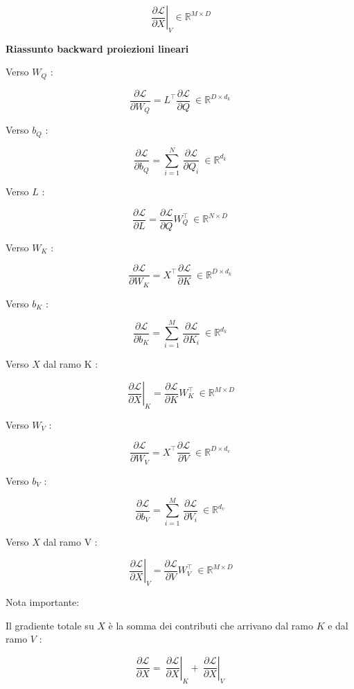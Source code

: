 \documentclass[
  11pt,
]{article}
\begin{document}
\[\left. \ \frac{\partial\mathcal{L}}{\partial X} \right|_{V} \in \mathbb{R}^{M \times D}\]

\textbf{Riassunto backward proiezioni lineari}

Verso \(W_{Q}\) :

\[\frac{\partial\mathcal{L}}{\partial W_{Q}} = L^{\top}\frac{\partial\mathcal{L}}{\partial Q}\  \in \mathbb{R}^{D \times d_{k}}\]

Verso \(b_{Q}\) :

\[\frac{\partial\mathcal{L}}{\partial b_{Q}} = \sum_{i = 1}^{N}\,\frac{\partial\mathcal{L}}{\partial Q_{i}}\  \in \mathbb{R}^{d_{k}}\]

Verso \(L\) :

\[\frac{\partial\mathcal{L}}{\partial L} = \frac{\partial\mathcal{L}}{\partial Q}W_{Q}^{\top}\  \in \mathbb{R}^{N \times D}\]

Verso \(W_{K}\) :

\[\frac{\partial\mathcal{L}}{\partial W_{K}} = X^{\top}\frac{\partial\mathcal{L}}{\partial K}\  \in \mathbb{R}^{D \times d_{k}}\]

Verso \(b_{K}\) :

\[\frac{\partial\mathcal{L}}{\partial b_{K}} = \sum_{i = 1}^{M}\,\frac{\partial\mathcal{L}}{\partial K_{i}}\  \in \mathbb{R}^{d_{k}}\]

Verso \(X\) dal ramo K :

\[\left. \ \frac{\partial\mathcal{L}}{\partial X} \right|_{K} = \frac{\partial\mathcal{L}}{\partial K}W_{K}^{\top}\  \in \mathbb{R}^{M \times D}\]

Verso \(W_{V}\) :

\[\frac{\partial\mathcal{L}}{\partial W_{V}} = X^{\top}\frac{\partial\mathcal{L}}{\partial V}\  \in \mathbb{R}^{D \times d_{v}}\]

Verso \(b_{V}\) :

\[\frac{\partial\mathcal{L}}{\partial b_{V}} = \sum_{i = 1}^{M}\,\frac{\partial\mathcal{L}}{\partial V_{i}}\  \in \mathbb{R}^{d_{v}}\]

Verso \(X\) dal ramo V :

\[\left. \ \frac{\partial\mathcal{L}}{\partial X} \right|_{V} = \frac{\partial\mathcal{L}}{\partial V}W_{V}^{\top}\  \in \mathbb{R}^{M \times D}\]

Nota importante:

Il gradiente totale su \(X\) è la somma dei contributi che arrivano dal
ramo \(K\) e dal ramo \(V\) :

\[\frac{\partial\mathcal{L}}{\partial X} = \left. \ \frac{\partial\mathcal{L}}{\partial X} \right|_{K} + \left. \ \frac{\partial\mathcal{L}}{\partial X} \right|_{V}\]
\end{document}
